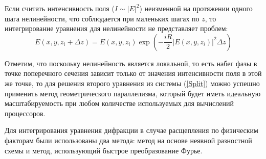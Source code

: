 Если считать интенсивность поля ($I \sim |E|^2$) неизменной на протяжении одного шага нелинейности, что соблюдается при маленьких шагах по $z$,
то интегрирование уравнения для нелинейности не представляет проблем:
\begin{equation}\label{KerrSolution}
    E(x,y,z_i + \Delta z) = E(x,y,z_i)\exp\left(-\frac{iR}{2}\left|E(x,y,z_i)\right|^2\Delta z\right)
\end{equation}

Отметим, что поскольку нелинейность является локальной, то есть набег фазы
в точке поперечного сечения зависит только от значения интенсивности поля в этой же точке,
то для решения второго уравнения из системы (\ref{Split}) можно успешно применить метод геометрического параллелизма,
который будет иметь идеальную масштабируемость при любом количестве используемых для вычислений процессоров.

Для интегрирования уравнения дифракции в случае расщепления по физическим факторам были использованы два метода:
метод на основе неявной разностной схемы и метод, использующий быстрое преобразование Фурье.

